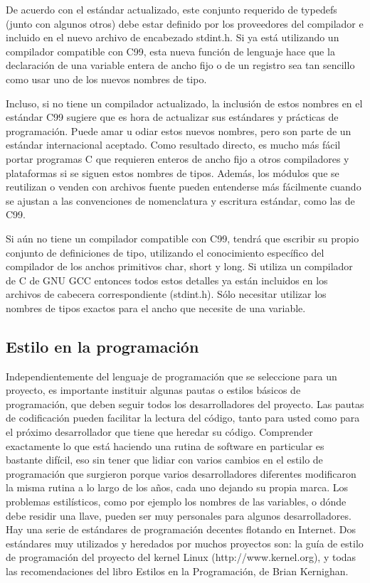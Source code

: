 \documentclass[output=paper, 
colorlinks,
citecolor=brown,
newtxmath
]{langscibook}
\begin{document}
De acuerdo con el estándar actualizado, este conjunto requerido de 
typedefs (junto con algunos otros) debe estar definido por los 
proveedores del compilador e incluido en el nuevo archivo 
de encabezado stdint.h. Si ya está utilizando un compilador 
compatible con C99, esta nueva función de lenguaje hace 
que la declaración de una variable entera de ancho fijo o de un registro 
sea tan sencillo como usar uno de los nuevos nombres de tipo.

Incluso, si no tiene un compilador actualizado, 
la inclusión de estos nombres en el estándar C99 sugiere 
que es hora de actualizar sus estándares y prácticas de programación. 
Puede amar u odiar estos nuevos nombres, pero son parte de un estándar 
internacional aceptado. Como resultado directo, es mucho más fácil 
portar programas C que requieren enteros de ancho fijo a otros compiladores 
y plataformas si se siguen estos nombres de tipos.
Además, los módulos que se reutilizan o venden con archivos fuente 
pueden entenderse más fácilmente cuando se ajustan 
a las convenciones de nomenclatura y escritura estándar, como las de C99.

Si aún no tiene un compilador compatible con C99, 
tendrá que escribir su propio conjunto de definiciones de tipo, 
utilizando el conocimiento específico del compilador 
de los anchos primitivos char, short y long. 
Si utiliza un compilador de C de GNU GCC entonces todos estos
detalles ya están incluidos en los archivos de cabecera correspondiente (stdint.h).
Sólo necesitar utilizar los nombres de tipos exactos para el ancho que
necesite de una variable.


\subsection {Estilo en la programación}

Independientemente del lenguaje de programación que se seleccione 
para un proyecto, es importante instituir algunas pautas 
o estilos básicos de programación, que deben seguir todos 
los desarrolladores del proyecto. 
Las pautas de codificación pueden facilitar la lectura del código, 
tanto para usted como para el próximo desarrollador que 
tiene que heredar su código. Comprender exactamente lo que está 
haciendo una rutina de software en particular es bastante difícil,
eso sin tener que lidiar con varios cambios en el estilo de programación
que surgieron porque varios desarrolladores diferentes modificaron
la misma rutina a lo largo de los años, cada uno dejando su propia marca. 
Los problemas estilísticos, como por ejemplo los nombres de las
variables, o dónde debe residir una llave, pueden ser 
muy personales para algunos desarrolladores.
Hay una serie de estándares de programación decentes flotando en Internet. 
Dos estándares muy utilizados y heredados por muchos proyectos son: 
la guía de estilo de programación del proyecto del kernel Linux (http://www.kernel.org),
y todas las recomendaciones del libro Estilos en la Programación, de Brian Kernighan.
\end{document}
